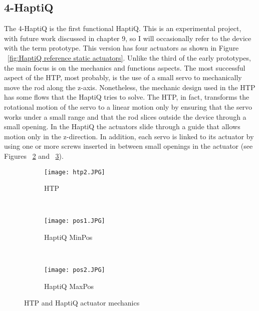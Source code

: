 \subsection{4-HaptiQ}
The 4-HaptiQ is the first functional HaptiQ. This is an experimental project, with future work discussed in chapter 9, so I will occasionally refer to the device with the term prototype. This version has four actuators as shown in Figure ~\ref{fig:HaptiQ reference static actuators}. Unlike the third of the early prototypes, the main focus is on the mechanics and functions aspects.
The most successful aspect of the HTP, most probably, is the use of a small servo to mechanically move the rod along the z-axis. Nonetheless, the mechanic design used in the HTP has some flows that the HaptiQ tries to solve. The HTP, in fact, transforms the rotational motion of the servo to a linear motion only by ensuring that the servo works under a small range and that the rod slices outside the device through a small opening.
In the HaptiQ the actuators slide through a guide that allows motion only in the z-direction. In addition, each servo is linked to its actuator by using one or more screws inserted in between small openings in the actuator (see Figures ~\ref{fig:HaptiQ MinPos} and ~\ref{fig:HaptiQ MaxPos}). 

\begin{figure}
        \centering
        \begin{subfigure}[H]{0.3\textwidth}
                \texttt{[image: htp2.JPG]}
                \caption{HTP}
                \label{fig:Mechanics HTP}
        \end{subfigure}%
        ~ %
        \begin{subfigure}[H]{0.3\textwidth}
                \texttt{[image: pos1.JPG]}
                \caption{HaptiQ MinPos}
                \label{fig:HaptiQ MinPos}
        \end{subfigure}
        ~ %
        \begin{subfigure}[H]{0.3\textwidth}
                \texttt{[image: pos2.JPG]}
                \caption{HaptiQ MaxPos}
                \label{fig:HaptiQ MaxPos}
        \end{subfigure}
        \caption{HTP and HaptiQ actuator mechanics}\label{fig:HTP and HaptiQ actuator mechanics}
\end{figure}

